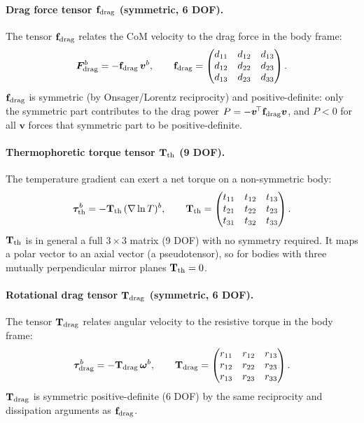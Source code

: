 \documentclass[11pt]{article}
\newcommand{\chg}[1]{\marginpar{\raggedright\footnotesize\textcolor{red!70!black}{\textsf{#1}}}}
\newcommand{\vect}[1]{\bm{#1}}
\newcommand{\T}{^{\!\top}}
\begin{document}
\paragraph{Drag force tensor $\mathbf f_{\rm drag}$ (symmetric, 6 DOF).} The tensor $\mathbf f_{\rm drag}$ relates the CoM velocity to the drag force in the body frame:
\begin{equation}
  \vect F^b_{\rm drag} = -\mathbf f_{\rm drag}\,\vect v^b, \qquad
  \mathbf f_{\rm drag} = \begin{pmatrix} d_{11} & d_{12} & d_{13}\\ d_{12} & d_{22} & d_{23}\\ d_{13} & d_{23} & d_{33}\end{pmatrix}.
\end{equation}
$\mathbf f_{\rm drag}$ is symmetric (by Onsager/Lorentz reciprocity) and positive-definite: only the symmetric part contributes to the drag power $P=-\vect v\T\mathbf f_{\rm drag}\vect v$, and $P<0$ for all $\vect v$ forces that symmetric part to be positive-definite.\chg{C2}

\paragraph{Thermophoretic torque tensor $\mathbf T_{\rm th}$ (9 DOF).} The temperature gradient can exert a net torque on a non-symmetric body:
\begin{equation}
  \vect\tau^b_{\rm th} = -\mathbf T_{\rm th}\,(\nabla\ln T)^b, \qquad
  \mathbf T_{\rm th} = \begin{pmatrix} t_{11} & t_{12} & t_{13}\\ t_{21} & t_{22} & t_{23}\\ t_{31} & t_{32} & t_{33}\end{pmatrix}.
\end{equation}
$\mathbf T_{\rm th}$ is in general a full $3\times3$ matrix (9 DOF) with no symmetry required. It maps a polar vector to an axial vector (a pseudotensor), so for bodies with three mutually perpendicular mirror planes $\mathbf T_{\rm th}=0$.

\paragraph{Rotational drag tensor $\mathbf T_{\rm drag}$ (symmetric, 6 DOF).} The tensor $\mathbf T_{\rm drag}$ relates angular velocity to the resistive torque in the body frame:
\begin{equation}
  \vect\tau^b_{\rm drag} = -\mathbf T_{\rm drag}\,\vect\omega^b, \qquad
  \mathbf T_{\rm drag} = \begin{pmatrix} r_{11} & r_{12} & r_{13}\\ r_{12} & r_{22} & r_{23}\\ r_{13} & r_{23} & r_{33}\end{pmatrix}.
\end{equation}
$\mathbf T_{\rm drag}$ is symmetric positive-definite (6 DOF) by the same reciprocity and dissipation arguments as $\mathbf f_{\rm drag}$.
\end{document}
